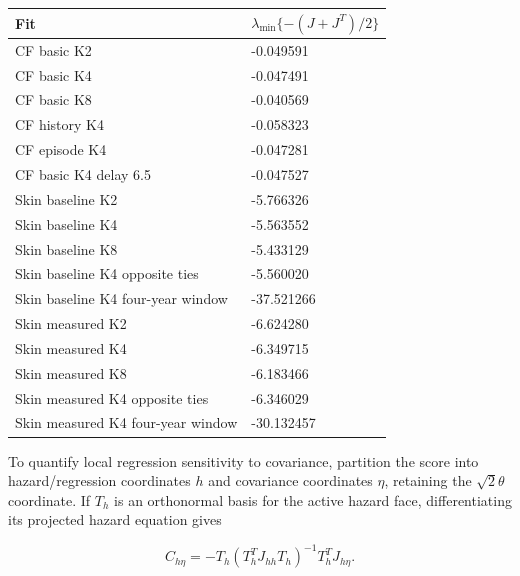 \documentclass[11pt]{article}
\begin{document}
{
\begin{longtable}{ll}
\toprule
\textbf{Fit} & \textbf{\(\lambda_{\min}\{-(J+J^T)/2\}\)} \\
\midrule
\endhead
\bottomrule
\endlastfoot
CF basic K2 & -0.049591 \\
CF basic K4 & -0.047491 \\
CF basic K8 & -0.040569 \\
CF history K4 & -0.058323 \\
CF episode K4 & -0.047281 \\
CF basic K4 delay 6.5 & -0.047527 \\
Skin baseline K2 & -5.766326 \\
Skin baseline K4 & -5.563552 \\
Skin baseline K8 & -5.433129 \\
Skin baseline K4 opposite ties & -5.560020 \\
Skin baseline K4 four-year window & -37.521266 \\
Skin measured K2 & -6.624280 \\
Skin measured K4 & -6.349715 \\
Skin measured K8 & -6.183466 \\
Skin measured K4 opposite ties & -6.346029 \\
Skin measured K4 four-year window & -30.132457 \\
\end{longtable}}

To quantify local regression sensitivity to covariance, partition the score into hazard/regression coordinates \(h\) and covariance coordinates \(\eta\), retaining the \(\sqrt2\theta\) coordinate. If \(T_h\) is an orthonormal basis for the active hazard face, differentiating its projected hazard equation gives

\begin{equation*}
C_{h\eta}=-T_h(T_h^T J_{hh}T_h)^{-1}T_h^T J_{h\eta}.
\end{equation*}
\end{document}

